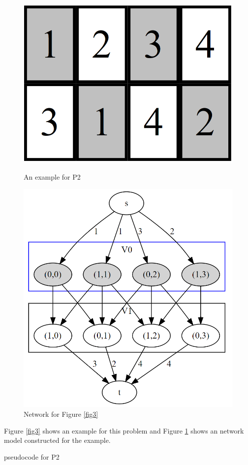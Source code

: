 \documentclass{article}
\begin{document}
\begin{enumerate}
\begin{figure}[htb]
\begin{minipage}[H]{0.25\linewidth}
    \includegraphics[width=1.0\linewidth]{3.png}
    \caption{An example for P2}
    \label{fig3}
\end{minipage}
\begin{minipage}[H]{0.5\linewidth}
    \centering
    \includegraphics[width=1.0\linewidth]{4.png}
    \caption{Network for Figure \ref{fig3}}
    \label{fig4}
\end{minipage}
\end{figure}
Figure \ref{fig3} shows an example for this problem and Figure \ref{fig4} shows an network model constructed for the example.
\begin{minipage}[htb]{0.9\textwidth}
\begin{algorithm}[H]
\caption{pseudocode for P2}
\label{selectroom}
\begin{algorithmic}[1]


\end{algorithmic}
\end{algorithm}
\end{minipage}
\end{enumerate}
\end{document}
